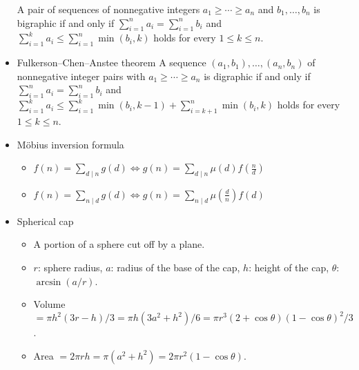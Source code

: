 \documentclass[10pt, a4paper, twocolumn, oneside]{article}
\begin{document}
\begin{itemize}
A pair of sequences of nonnegative integers $a_1\ge\cdots\ge a_n$ and $b_1,\ldots,b_n$ is bigraphic if and only if $\displaystyle\sum_{i=1}^n a_i=\displaystyle\sum_{i=1}^n b_i$ and $\displaystyle\sum_{i=1}^k a_i\le \displaystyle\sum_{i=1}^n\min(b_i,k)$ holds for every $1\le k\le n$.
\item Fulkerson–Chen–Anstee theorem
A sequence $(a_1,b_1),\ldots,(a_n,b_n)$ of nonnegative integer pairs with $a_1\ge\cdots\ge a_n$ is digraphic if and only if $\displaystyle\sum_{i=1}^n a_i=\displaystyle\sum_{i=1}^n b_i$ and $\displaystyle\sum_{i=1}^k a_i\le \displaystyle\sum_{i=1}^k\min(b_i,k-1)+\displaystyle\sum_{i=k+1}^n\min(b_i,k)$ holds for every $1\le k\le n$.
\item Möbius inversion formula
\begin{itemize}
    \itemsep-0.5em
  \item $f(n)=\sum_{d\mid n}g(d)\Leftrightarrow g(n)=\sum_{d\mid n}\mu(d)f(\frac{n}{d})$
  \item $f(n)=\sum_{n\mid d}g(d)\Leftrightarrow g(n)=\sum_{n\mid d}\mu(\frac{d}{n})f(d)$
\end{itemize}
\item Spherical cap
\begin{itemize}
    \itemsep-0.5em
  \item A portion of a sphere cut off by a plane.
  \item $r$: sphere radius, $a$: radius of the base of the cap, $h$: height of the cap, $\theta$: $\arcsin(a/r)$.
  \item Volume $=\pi h^2(3r-h)/3=\pi h(3a^2+h^2)/6=\pi r^3(2+\cos\theta)(1-\cos\theta)^2/3$.
  \item Area $=2\pi rh=\pi(a^2+h^2)=2\pi r^2(1-\cos\theta)$.
\end{itemize}
\end{itemize}
\end{document}
